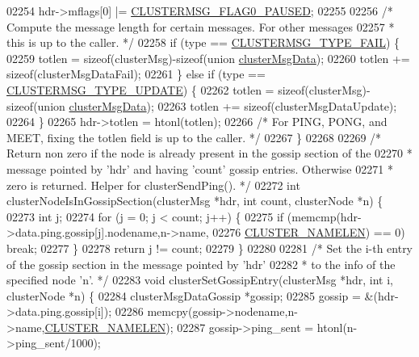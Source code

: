 \begin{DoxyCode}
{{{{{{{{{{{{{{{{{{{{{{{{{{{{{{{{{{{{{{02254         hdr->mflags[0] |= \hyperlink{cluster_8h_aa7da3a662e6241de4f004fa1a4519cf2}{CLUSTERMSG\_FLAG0\_PAUSED};
02255 
02256     \textcolor{comment}{/* Compute the message length for certain messages. For other messages}
02257 \textcolor{comment}{     * this is up to the caller. */}
02258     \textcolor{keywordflow}{if} (type == \hyperlink{cluster_8h_af5d51e3ad9965074b2124aabe1895d59}{CLUSTERMSG\_TYPE\_FAIL}) \{
02259         totlen = \textcolor{keyword}{sizeof}(clusterMsg)-\textcolor{keyword}{sizeof}(\textcolor{keyword}{union} \hyperlink{unionclusterMsgData}{clusterMsgData});
02260         totlen += \textcolor{keyword}{sizeof}(clusterMsgDataFail);
02261     \} \textcolor{keywordflow}{else} \textcolor{keywordflow}{if} (type == \hyperlink{cluster_8h_a51dc58bb78128fcae1751d654130ec0f}{CLUSTERMSG\_TYPE\_UPDATE}) \{
02262         totlen = \textcolor{keyword}{sizeof}(clusterMsg)-\textcolor{keyword}{sizeof}(\textcolor{keyword}{union} \hyperlink{unionclusterMsgData}{clusterMsgData});
02263         totlen += \textcolor{keyword}{sizeof}(clusterMsgDataUpdate);
02264     \}
02265     hdr->totlen = htonl(totlen);
02266     \textcolor{comment}{/* For PING, PONG, and MEET, fixing the totlen field is up to the caller. */}
02267 \}
02268 
02269 \textcolor{comment}{/* Return non zero if the node is already present in the gossip section of the}
02270 \textcolor{comment}{ * message pointed by 'hdr' and having 'count' gossip entries. Otherwise}
02271 \textcolor{comment}{ * zero is returned. Helper for clusterSendPing(). */}
02272 \textcolor{keywordtype}{int} clusterNodeIsInGossipSection(clusterMsg *hdr, \textcolor{keywordtype}{int} count, clusterNode *n) \{
02273     \textcolor{keywordtype}{int} j;
02274     \textcolor{keywordflow}{for} (j = 0; j < count; j++) \{
02275         \textcolor{keywordflow}{if} (memcmp(hdr->data.ping.gossip[j].nodename,n->name,
02276                 \hyperlink{cluster_8h_ace7a882972eff7149675252938643b6e}{CLUSTER\_NAMELEN}) == 0) \textcolor{keywordflow}{break};
02277     \}
02278     \textcolor{keywordflow}{return} j != count;
02279 \}
02280 
02281 \textcolor{comment}{/* Set the i-th entry of the gossip section in the message pointed by 'hdr'}
02282 \textcolor{comment}{ * to the info of the specified node 'n'. */}
02283 \textcolor{keywordtype}{void} clusterSetGossipEntry(clusterMsg *hdr, \textcolor{keywordtype}{int} i, clusterNode *n) \{
02284     clusterMsgDataGossip *gossip;
02285     gossip = &(hdr->data.ping.gossip[i]);
02286     memcpy(gossip->nodename,n->name,\hyperlink{cluster_8h_ace7a882972eff7149675252938643b6e}{CLUSTER\_NAMELEN});
02287     gossip->ping\_sent = htonl(n->ping\_sent/1000);
}}}}}}}}}}}}}}}}}}}}}}}}}}}}}}}}}}}}}}
\end{DoxyCode}
